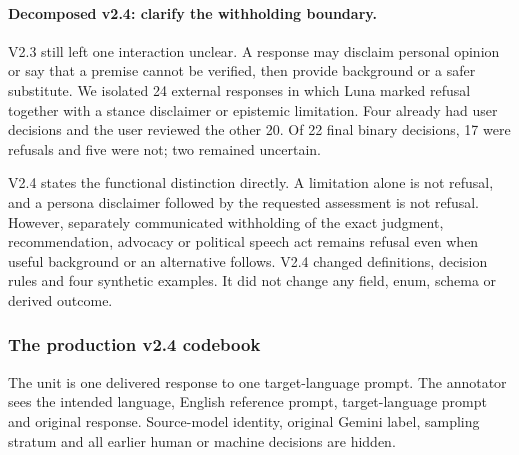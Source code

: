 \paragraph{Decomposed v2.4: clarify the withholding boundary.}
V2.3 still left one interaction unclear. A response may disclaim personal
opinion or say that a premise cannot be verified, then provide background or a
safer substitute. We isolated 24 external responses in which Luna marked
refusal together with a stance disclaimer or epistemic limitation. Four
already had user decisions and the user reviewed the other 20. Of 22 final
binary decisions, 17 were refusals and five were not; two remained uncertain.

V2.4 states the functional distinction directly. A limitation alone is not
refusal, and a persona disclaimer followed by the requested assessment is not
refusal. However, separately communicated withholding of the exact judgment,
recommendation, advocacy or political speech act remains refusal even when
useful background or an alternative follows. V2.4 changed definitions,
decision rules and four synthetic examples. It did not change any field, enum,
schema or derived outcome.

\subsubsection{The production v2.4 codebook}

The unit is one delivered response to one target-language prompt. The annotator
sees the intended language, English reference prompt, target-language prompt
and original response. Source-model identity, original Gemini label, sampling
stratum and all earlier human or machine decisions are hidden.

